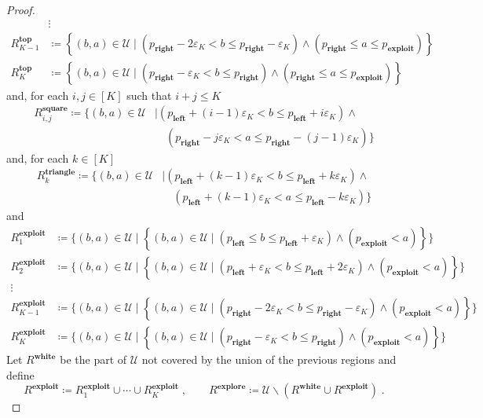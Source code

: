 \documentclass[final,12pt]{colt2025}
\newcommand{\cU}{\mathcal{U}}
\newcommand{\e}{\varepsilon}
\newcommand{\lrb}[1]{\left(#1\right)}
\newcommand{\lcb}[1]{\left\{#1\right\}}
\newcommand{\nb}{b}
\newcommand{\ns}{a}
\begin{document}
{\begin{proof}
\begin{align*}
&\vdots
\\
    R^{\textbf{top}}_{K-1}
&\coloneqq
    \lcb{ (\nb, \ns) \in \cU \mid (p_{\textbf{right}} - 2 \e_K < \nb \le p_{\textbf{right}} - \e_K) \land \lrb{p_{\textbf{right}} \le \ns \le p_{\textbf{exploit}}}}
\\
    R^{\textbf{top}}_K
&\coloneqq
    \lcb{ (\nb, \ns) \in \cU \mid (p_{\textbf{right}} - \e_K < \nb \le p_{\textbf{right}} ) \land \lrb{p_{\textbf{right}} \le \ns \le p_{\textbf{exploit}}}}
\end{align*}
and, for each $i,j\in [K]$ such that $i+j \le K$
\begin{align*}
    R^{\textbf{square}}_{i,j}
    \coloneqq
    \{
        (\nb, \ns) \in \cU
        & \mid
        (p_{\textbf{left}} + (i - 1) \e_K < \nb \le p_{\textbf{left}} + i \e_K) \land \\
        & \quad 
        (p_{\textbf{right}} - j \e_K < \ns \le p_{\textbf{right}} - (j - 1) \e_K)
    \}
\end{align*}
and, for each $k \in [K]$
\begin{align*}
    R^{\textbf{triangle}}_{k}
    \coloneqq
    \{
        (\nb, \ns) \in \cU
        & \mid
        (p_{\textbf{left}} + (k - 1) \e_K < \nb \le p_{\textbf{left}} + k \e_K) \land \\
        & \quad 
        (p_{\textbf{left}} + (k - 1) \e_K < \ns \le p_{\textbf{left}} - k \e_K)
    \}
\end{align*}
and
\begin{align*}
    R^{\textbf{exploit}}_{1}
    &\coloneqq
    \{
        (\nb, \ns) \in \cU
        \mid
        \lcb{ (\nb, \ns) \in \cU \mid (p_{\textbf{left}} \le \nb \le p_{\textbf{left}} + \e_K) \land \lrb{p_{\textbf{exploit}} < \ns}}
    \} \\
    R^{\textbf{exploit}}_{2}
    &\coloneqq
    \{
        (\nb, \ns) \in \cU
        \mid
        \lcb{ (\nb, \ns) \in \cU \mid (p_{\textbf{left}} + \e_K < \nb \le p_{\textbf{left}} + 2\e_K) \land \lrb{p_{\textbf{exploit}} < \ns}}
    \} \\
    \vdots \\
    R^{\textbf{exploit}}_{K - 1}
    &\coloneqq
    \{
        (\nb, \ns) \in \cU
        \mid
        \lcb{ (\nb, \ns) \in \cU \mid (p_{\textbf{right}} - 2 \e_K < \nb \le p_{\textbf{right}} - \e_K) \land \lrb{p_{\textbf{exploit}} < \ns}}
    \} \\
        R^{\textbf{exploit}}_{K}
    &\coloneqq
    \{
        (\nb, \ns) \in \cU
        \mid
        \lcb{ (\nb, \ns) \in \cU \mid (p_{\textbf{right}} - \e_K < \nb \le p_{\textbf{right}}) \land \lrb{p_{\textbf{exploit}} < \ns}}
    \}
\end{align*}
Let $R^{\textbf{white}}$ be the part of $\cU$ not covered by the union of the previous regions and define
\[
    R^{\textbf{exploit}}
    \coloneqq R^{\textbf{exploit}}_1 \cup \cdots \cup R^{\textbf{exploit}}_K \; ,
    \qquad
    R^{\textbf{explore}}
    \coloneqq \cU \backslash (R^{\textbf{white}} \cup R^{\textbf{exploit}}) \; .
\]


\end{proof}}
\end{document}
